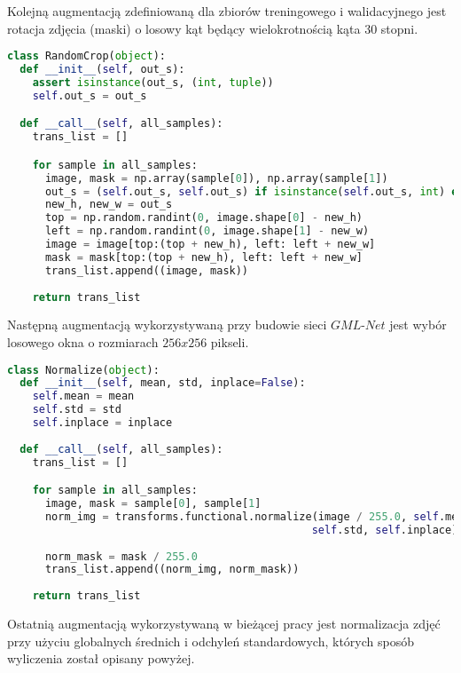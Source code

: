 \cell
Kolejną augmentacją zdefiniowaną dla zbiorów treningowego i walidacyjnego jest rotacja zdjęcia (maski) o losowy kąt będący wielokrotnością kąta 30 stopni.

\cell
\begin{lstlisting}[name=Rozdzial3.1, language=Python]
class RandomCrop(object):
  def __init__(self, out_s):
    assert isinstance(out_s, (int, tuple))
    self.out_s = out_s     

  def __call__(self, all_samples):
    trans_list = []

    for sample in all_samples:
      image, mask = np.array(sample[0]), np.array(sample[1])
      out_s = (self.out_s, self.out_s) if isinstance(self.out_s, int) else out_s
      new_h, new_w = out_s
      top = np.random.randint(0, image.shape[0] - new_h)
      left = np.random.randint(0, image.shape[1] - new_w)
      image = image[top:(top + new_h), left: left + new_w]
      mask = mask[top:(top + new_h), left: left + new_w]
      trans_list.append((image, mask))
    
    return trans_list
\end{lstlisting}


\cell
Następną augmentacją wykorzystywaną przy budowie sieci $\textit{GML-Net}$ jest wybór losowego okna o rozmiarach $\textit{256x256}$ pikseli. 

\cell
\begin{lstlisting}[name=Rozdzial3.1, language=Python]
 class Normalize(object):    
  def __init__(self, mean, std, inplace=False):
    self.mean = mean
    self.std = std
    self.inplace = inplace
  
  def __call__(self, all_samples):
    trans_list = []

    for sample in all_samples:
      image, mask = sample[0], sample[1]
      norm_img = transforms.functional.normalize(image / 255.0, self.mean, 
                                                self.std, self.inplace)
                                                
      norm_mask = mask / 255.0
      trans_list.append((norm_img, norm_mask))
    
    return trans_list
\end{lstlisting}


\cell
Ostatnią augmentacją wykorzystywaną w bieżącej pracy jest normalizacja zdjęć przy użyciu globalnych średnich i odchyleń standardowych, których sposób wyliczenia został opisany powyżej.
\vspace{0.5cm}

